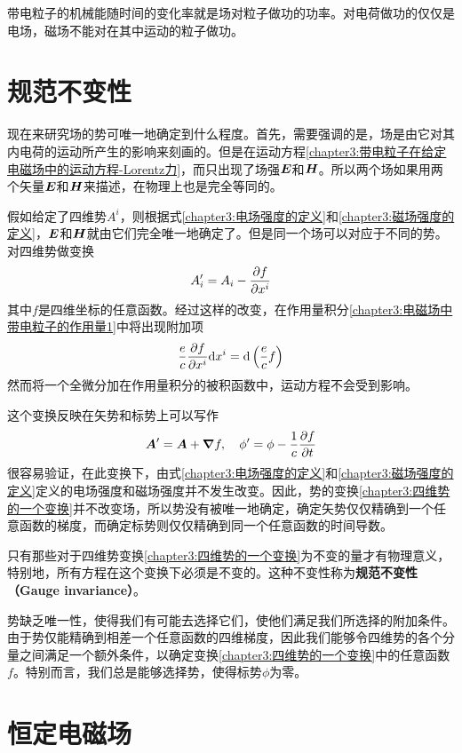 带电粒子的机械能随时间的变化率就是场对粒子做功的功率。对电荷做功的仅仅是电场，磁场不能对在其中运动的粒子做功。

\section{规范不变性}

现在来研究场的势可唯一地确定到什么程度。首先，需要强调的是，场是由它对其内电荷的运动所产生的影响来刻画的。但是在运动方程\eqref{chapter3:带电粒子在给定电磁场中的运动方程-Lorentz力}，而只出现了场强$\boldsymbol{E}$和$\boldsymbol{H}$。所以两个场如果用两个矢量$\boldsymbol{E}$和$\boldsymbol{H}$来描述，在物理上也是完全等同的。

假如给定了四维势$A^i$，则根据式\eqref{chapter3:电场强度的定义}和\eqref{chapter3:磁场强度的定义}，$\boldsymbol{E}$和$\boldsymbol{H}$就由它们完全唯一地确定了。但是同一个场可以对应于不同的势。对四维势做变换
\begin{equation}
	A'_i = A_i-\frac{\partial f}{\partial x^i}
	\label{chapter3:四维势的一个变换}
\end{equation}
其中$f$是四维坐标的任意函数。经过这样的改变，在作用量积分\eqref{chapter3:电磁场中带电粒子的作用量1}中将出现附加项
\begin{equation}
	\dfrac{e}{c}\frac{\partial f}{\partial x^i}\mathrm{d} x^i = \mathrm{d} \left(\dfrac{e}{c}f\right)
\end{equation}
然而将一个全微分加在作用量积分的被积函数中，运动方程不会受到影响。

这个变换反映在矢势和标势上可以写作
\begin{equation}
	\boldsymbol{A}'=\boldsymbol{A} + \boldsymbol{\nabla} f,\quad \phi' = \phi-\frac1c\frac{\partial f}{\partial t}
\end{equation}
很容易验证，在此变换下，由式\eqref{chapter3:电场强度的定义}和\eqref{chapter3:磁场强度的定义}定义的电场强度和磁场强度并不发生改变。因此，势的变换\eqref{chapter3:四维势的一个变换}并不改变场，所以势没有被唯一地确定，确定矢势仅仅精确到一个任意函数的梯度，而确定标势则仅仅精确到同一个任意函数的时间导数。

只有那些对于四维势变换\eqref{chapter3:四维势的一个变换}为不变的量才有物理意义，特别地，所有方程在这个变换下必须是不变的。这种不变性称为{\bf 规范不变性（Gauge invariance）}。

势缺乏唯一性，使得我们有可能去选择它们，使他们满足我们所选择的附加条件。由于势仅能精确到相差一个任意函数的四维梯度，因此我们能够令四维势的各个分量之间满足一个额外条件，以确定变换\eqref{chapter3:四维势的一个变换}中的任意函数$f$。特别而言，我们总是能够选择势，使得标势$\phi$为零。

\section{恒定电磁场}

